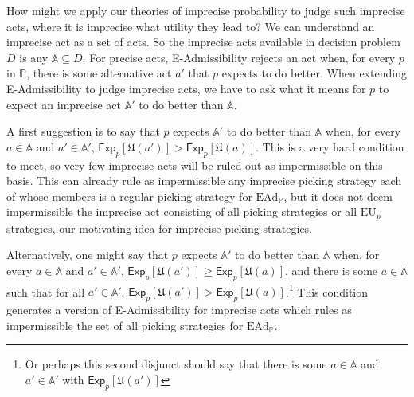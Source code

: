 \documentclass[a4paper]{article}
\renewcommand\P{\mathbb{P}} %
\newcommand\Exp{\mathsf{Exp}}
\newcommand\EU{\mathrm{EU}}
\newcommand\EAd{\mathrm{EAd}}
\newcommand\U{\mathfrak{U}} %
\newcommand{\IP}{\P}
\renewcommand{\color}[1]{}
\renewcommand{\geq}{\geqslant}
\newenvironment{CCM rewritten}
{\begingroup\color{blue}} %
{\endgroup}              %
\begin{document}
	{\color{violet}
	How might we apply our theories of imprecise probability to judge such imprecise acts, where it is imprecise what utility they lead to? 	We can understand an imprecise act as a set of acts. So the imprecise acts available in decision problem $D$ is any $\mathbb{A}\subseteq D$. 
	For precise acts, E-Admissibility rejects an act when, for every $p$ in $\IP$, there is some alternative act $a'$ that $p$ expects to do better. When extending E-Admissibility to judge imprecise acts, we have to ask what it means for $p$ to expect an imprecise act $\mathbb{A}'$ to do better than $\mathbb{A}$. 
	
	A first suggestion is to say that $p$ expects $\mathbb{A}'$ to do better than $\mathbb{A}$ when, for every $a\in\mathbb{A}$ and $a'\in\mathbb{A}'$, $\Exp_p[\U(a')]>\Exp_p[\U(a)]$. This is a very hard condition to meet, so very few imprecise acts will be ruled out as impermissible on this basis. This can already rule as impermissible any imprecise picking strategy each of whose members is a regular picking strategy for $\EAd_\IP$, but it does not deem impermissible the imprecise act consisting of all picking strategies or all $\EU_p$ strategies, our motivating idea for imprecise picking strategies. 
	
	Alternatively, one might say that $p$ expects $\mathbb{A}'$ to do better than $\mathbb{A}$ when, for every $a\in\mathbb{A}$ and $a'\in\mathbb{A}'$, $\Exp_p[\U(a')]\geq\Exp_p[\U(a)]$, and there is some $a\in\mathbb{A}$ such that for all $a'\in\mathbb{A}'$, $\Exp_p[\U(a')]>\Exp_p[\U(a)]$.\footnote{Or perhaps this second disjunct should say that there is some $a\in\mathbb{A}$ and $a'\in\mathbb{A}'$ with $\Exp_p[\U(a')]$}
	This condition generates a version of E-Admissibility for imprecise acts which rules as impermissible the set of all picking strategies for $\EAd_\IP$. 
	
}
\end{document}
